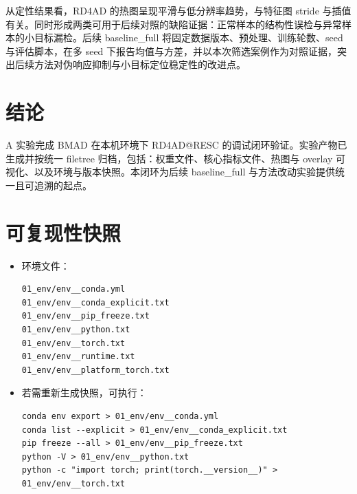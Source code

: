 \documentclass[a4paper,11pt,UTF8]{ctexart}
\begin{document}
从定性结果看，RD4AD 的热图呈现平滑与低分辨率趋势，与特征图 stride 与插值有关。同时形成两类可用于后续对照的缺陷证据：正常样本的结构性误检与异常样本的小目标漏检。后续 baseline\_full 将固定数据版本、预处理、训练轮数、seed 与评估脚本，在多 seed 下报告均值与方差，并以本次筛选案例作为对照证据，突出后续方法对伪响应抑制与小目标定位稳定性的改进点。

\section{结论}
A 实验完成 BMAD 在本机环境下 RD4AD@RESC 的调试闭环验证。实验产物已生成并按统一 filetree 归档，包括：权重文件、核心指标文件、热图与 overlay 可视化、以及环境与版本快照。本闭环为后续 baseline\_full 与方法改动实验提供统一且可追溯的起点。

\appendix
\section{可复现性快照}
\begin{itemize}
  \item 环境文件：
  \begin{lstlisting}
01_env/env__conda.yml
01_env/env__conda_explicit.txt
01_env/env__pip_freeze.txt
01_env/env__python.txt
01_env/env__torch.txt
01_env/env__runtime.txt
01_env/env__platform_torch.txt
  \end{lstlisting}

  \item 若需重新生成快照，可执行：
  \begin{lstlisting}
conda env export > 01_env/env__conda.yml
conda list --explicit > 01_env/env__conda_explicit.txt
pip freeze --all > 01_env/env__pip_freeze.txt
python -V > 01_env/env__python.txt
python -c "import torch; print(torch.__version__)" > 01_env/env__torch.txt
  \end{lstlisting}
\end{itemize}
\end{document}
